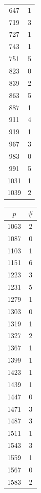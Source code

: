 \documentclass[10pt,a4paper]{amsart}
\begin{document}
\begin{table}[htbp]
\begin{minipage}{0.135\textwidth}
\begin{tabular}{c|c}
        647 & 1 \\
        719 & 3 \\
        727 & 1 \\
        743 & 1 \\
        751 & 5 \\
        823 & 0 \\
        839 & 2 \\
        863 & 5 \\
        887 & 1 \\
        911 & 4 \\
        919 & 1 \\
        967 & 3 \\
        983 & 0 \\
        991 & 5 \\
        1031 & 1 \\
        1039 & 2
    \end{tabular}
\end{minipage}\hspace{-2mm}
%
\begin{minipage}{0.135\textwidth}
    \centering
    \begin{tabular}{c|c}
        $p$ & $\#$ \\ \hline
        1063 & 2 \\
        1087 & 0 \\
        1103 & 1 \\
        1151 & 6 \\
        1223 & 3 \\
        1231 & 5 \\
        1279 & 1 \\
        1303 & 0 \\
        1319 & 1 \\
        1327 & 2 \\
        1367 & 1 \\
        1399 & 1 \\
        1423 & 1 \\
        1439 & 1 \\
        1447 & 0 \\
        1471 & 3 \\
        1487 & 3 \\
        1511 & 1 \\
        1543 & 3 \\
        1559 & 1 \\
        1567 & 0 \\
        1583 & 2 \\

\end{tabular}
\end{minipage}
\end{table}
\end{document}
